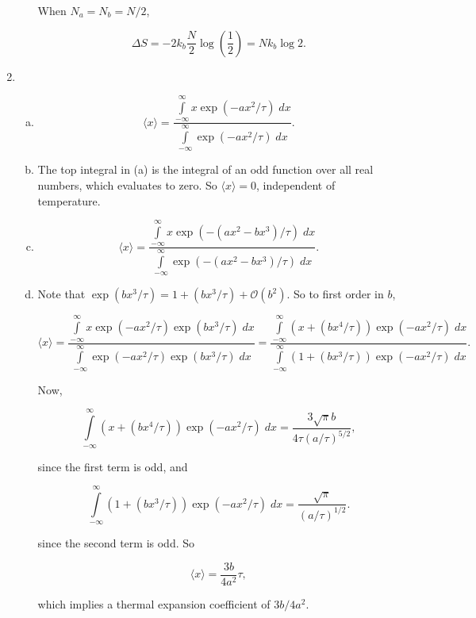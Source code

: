 \documentclass{article}
\begin{document}
\begin{enumerate}
\begin{enumerate}[(a)]
		When $N_a = N_b = N/2$,

		$$\Delta S = -2 k_b \frac{N}{2} \log \left( \frac{1}{2} \right) = N k_b \log 2.$$

	\end{enumerate}

	\item

	\begin{enumerate}[(a)]

		\item

		$$\langle x \rangle = \frac{ \int \limits_{-\infty}^{\infty} x \exp (-a x^2 / \tau) \; dx  } { \int \limits_{-\infty}^{\infty} \exp (-a x^2 / \tau) \; dx }.$$

		\item

		The top integral in (a) is the integral of an odd function over all real numbers, which evaluates to zero. So $\langle x \rangle = 0$, independent of temperature.

		\item

		$$\langle x \rangle = \frac{ \int \limits_{-\infty}^{\infty} x \exp (-(a x^2 - bx^3) / \tau) \; dx  } { \int \limits_{-\infty}^{\infty} \exp (-(a x^2 - bx^3) / \tau) \; dx }.$$

		\item

		Note that $\exp (bx^3 / \tau) = 1 + (bx^3/ \tau) + \mathcal{O}(b^2)$. So to first order in $b$, 

		$$
		\langle x \rangle = \frac{ \int \limits_{-\infty}^{\infty} x \exp (-a x^2 / \tau) \exp (bx^3 / \tau ) \; dx  } { \int \limits_{-\infty}^{\infty} \exp (-a x^2 / \tau) \exp (bx^3 / \tau ) \; dx } = \frac{ \int \limits_{-\infty}^{\infty} (x + (bx^4 / \tau)) \exp (-a x^2 / \tau) \; dx  } { \int \limits_{-\infty}^{\infty} (1 + (bx^3/ \tau)) \exp (-a x^2 / \tau) \; dx }.
		$$

		Now,

		$$\int \limits_{-\infty}^{\infty} (x + (bx^4 / \tau)) \exp (-a x^2 / \tau) \; dx = \frac{3 \sqrt{\pi} b}{4 \tau (a /\tau)^{5/2}},$$

		since the first term is odd, and

		$$\int \limits_{-\infty}^{\infty} (1 + (bx^3/ \tau)) \exp (-a x^2 / \tau) \; dx = \frac{ \sqrt{\pi} }{ (a /\tau)^{1/2}}.$$

		since the second term is odd. So

		$$\langle x \rangle = \frac{3b}{4a^2} \tau,$$

		which implies a thermal expansion coefficient of $3b / 4a^2$.


	\end{enumerate}


\end{enumerate}
\end{document}
